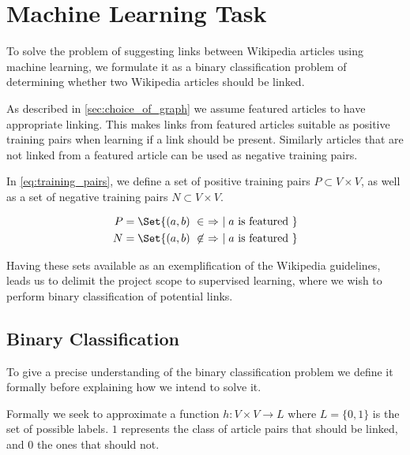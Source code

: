 \section{Machine Learning Task}\label{sec:machine_learning_task}
To solve the problem of suggesting links between Wikipedia articles using machine learning, we formulate it as a binary classification problem of determining whether two Wikipedia articles should be linked.

As described in \cref{sec:choice_of_graph} we assume featured articles to have appropriate linking. This makes links from featured articles suitable as positive training pairs when learning if a link should be present. Similarly articles that are not linked from a featured article can be used as negative training pairs.

In \cref{eq:training_pairs}, we define a set of positive training pairs $P \subset V \times V$, as well as a set of negative training pairs $N \subset V \times V$.

\begin{equation}
\label{eq:training_pairs}
  \begin{split}
    P &= \Set{(a,b)\ \in\ \Rightarrow\ \mid a\text{ is featured}\ } \\
    N &= \Set{(a,b)\ \not\in\ \Rightarrow\ \mid a\text{ is featured}\ }
  \end{split}
\end{equation}

Having these sets available as an exemplification of the Wikipedia guidelines, leads us to delimit the project scope to supervised learning, where we wish to perform binary classification of potential links.


\subsection{Binary Classification}\label{sec:ml_def}
To give a precise understanding of the binary classification problem we define it formally before explaining how we intend to solve it.

Formally we seek to approximate a function $h: V \times V \to L$ where $L=\{0,1\}$ is the set of possible labels. $1$ represents the class of article pairs that should be linked, and $0$ the ones that should not.


